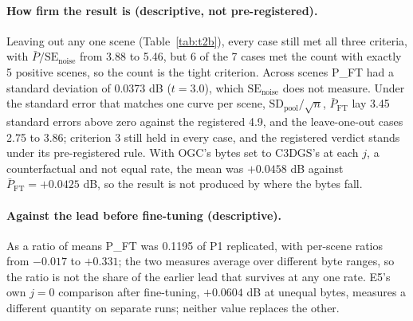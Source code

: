 \begin{table}[t]
\centering
\small
\caption{E6 part (b), leave-one-out (descriptive, not pre-registered): the three criteria over the six scenes left when the row's scene is removed. Generated from the committed bundles.}
\label{tab:t2b}

\end{table}

\paragraph{How firm the result is (descriptive, not pre-registered).}
Leaving out any one scene (Table~\ref{tab:t2b}), every case still met all three criteria, with $\bar P / \mathrm{SE}_{\mathrm{noise}}$ from 3.88 to 5.46, but 6 of the 7 cases met the count with exactly 5 positive scenes, so the count is the tight criterion. %
Across scenes P\_FT had a standard deviation of 0.0373 dB ($t = 3.0$), which $\mathrm{SE}_{\mathrm{noise}}$ does not measure. %
Under the standard error that matches one curve per scene, $\mathrm{SD}_{\mathrm{pool}}/\sqrt{n}$, $\bar P_{\mathrm{FT}}$ lay 3.45 standard errors above zero against the registered 4.9, and the leave-one-out cases 2.75 to 3.86; criterion 3 still held in every case, and the registered verdict stands under its pre-registered rule. %
With OGC's bytes set to C3DGS's at each $j$, a counterfactual and not equal rate, the mean was $+0.0458$ dB against $\bar P_{\mathrm{FT}} = +0.0425$ dB, so the result is not produced by where the bytes fall. %

\paragraph{Against the lead before fine-tuning (descriptive).}
As a ratio of means P\_FT was 0.1195 of P1 replicated, with per-scene ratios from $-0.017$ to $+0.331$; the two measures average over different byte ranges, so the ratio is not the share of the earlier lead that survives at any one rate. %
E5's own $j = 0$ comparison after fine-tuning, $+0.0604$ dB at unequal bytes, measures a different quantity on separate runs; neither value replaces the other. %

